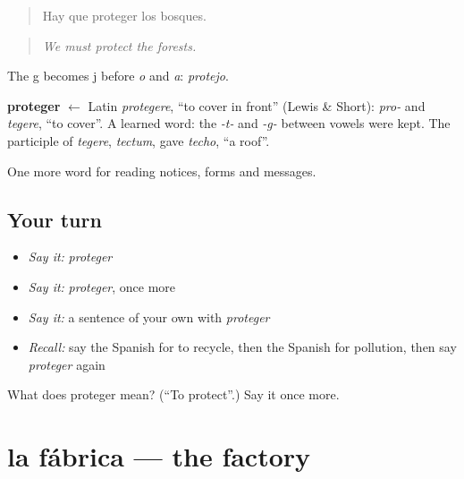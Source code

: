 \begin{quote}
Hay que proteger los bosques.
\end{quote}

\begin{quote}
\emph{We must protect the forests.}
\end{quote}

The g becomes j before \emph{o} and \emph{a}: \emph{protejo}.

\begin{cousinweb}
\textbf{proteger} $\leftarrow$ Latin \emph{protegere}, \textquotedblleft{}to cover in front\textquotedblright{} (Lewis \& Short): \emph{pro-} and \emph{tegere}, \textquotedblleft{}to cover\textquotedblright{}. A learned word: the \emph{-t-} and \emph{-g-} between vowels were kept. The participle of \emph{tegere}, \emph{tectum}, gave \emph{techo}, \textquotedblleft{}a roof\textquotedblright{}.
\end{cousinweb}

\begin{grammarlens}[title={What you've built}]
One more word for reading notices, forms and messages.
\end{grammarlens}

\subsection*{Your turn}
\begin{itemize}
\raggedright
  \item \emph{Say it:} \emph{proteger}
  \item \emph{Say it:} \emph{proteger}, once more
  \item \emph{Say it:} a sentence of your own with \emph{proteger}
  \item \emph{Recall:} say the Spanish for to recycle, then the Spanish for pollution, then say \emph{proteger} again
\end{itemize}

\begin{tcolorbox}[breakable,colback=teal!4,colframe=teal!35!black,title={Before you move on}]
What does proteger mean? (\textquotedblleft{}To protect\textquotedblright{}.) Say it once more.
\end{tcolorbox}
\section[la fábrica]{la fábrica — the factory}

\label{lesson:ES-C504-fabrica}



